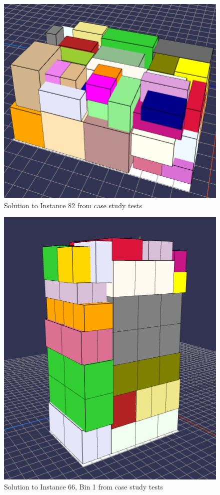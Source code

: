 \documentclass[11pt,a4paper,twocolumn]{article}
\begin{document}
\begin{figure}
    \centering
    \includegraphics[width = \columnwidth]{tests/usecase/instance-82_k200.PNG}
    \caption{Solution to Instance 82 from case study tests}
\end{figure}

\begin{figure}
    \centering
    \includegraphics[width = \columnwidth]{tests/usecase/instance-66_bin1_k200.PNG}
    \caption{Solution to Instance 66, Bin 1 from case study tests}
\end{figure}
\end{document}
